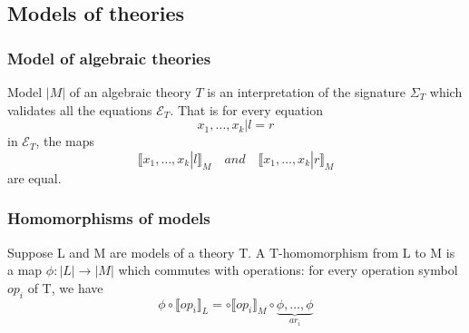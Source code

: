 \documentclass{beamer}
\begin{document}
\subsection{Models of theories}
\begin{frame}
    \frametitle{Model of algebraic theories}
    \begin{definition}
        Model $|M|$ of an algebraic theory $T$ is an interpretation of the signature $\Sigma_T$
        which validates all the equations $\mathcal{E}_T$. That is for every equation
        \[
          x_1, \ldots, x_k | l = r   
        \]
        in $\mathcal{E}_T$, the maps 
        \[
          \llbracket x_1, \ldots, x_k | l \rrbracket_M  
           \quad and \quad \llbracket x_1, \ldots, x_k | r \rrbracket_M  
        \]
        are equal.
    \end{definition}

    

\end{frame}

\begin{frame}
    \frametitle{Homomorphisms of models}
    \begin{definition}
        Suppose L and M are models of a theory T. A T-homomorphism from L to M is a map
        $\phi : |L| \rightarrow |M |$
        which commutes with operations: for every operation symbol $op_i$ of T, we have
        \[
            \phi \circ \llbracket op_i \rrbracket_L = \circ \llbracket op_i \rrbracket_M \circ 
            \underbrace{\phi, \ldots, \phi}_{ar_i}
        \]
    \end{definition}    

\end{frame}
\end{document}
